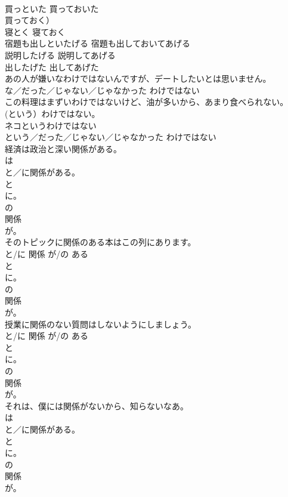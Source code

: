 \documentclass[8pt]{extreport}
\begin{document}
\begin{CJK}{UTF8}{min}
{\\	買っといた	買っておいた 
\\	買っておく）	
\\	寝とく	寝ておく	
\\	宿題も出しといたげる	宿題も出しておいてあげる	
\\	説明したげる	説明してあげる	
\\	出したげた	出してあげた	
\\	あの人が嫌いなわけではないんですが、デートしたいとは思いません。	
\\	{な／だった／じゃない／じゃなかった} わけではない 
\\	この料理はまずいわけではないけど、油が多いから、あまり食べられない。	
\\	(という）わけではない。 
\\	ネコというわけではない	
\\	{という／だった／じゃない／じゃなかった} わけではない 
\\	経済は政治と深い関係がある。	
\\	は 
\\	{と／に}関係がある。 
\\	と 
\\	に。 
\\	の 
\\	関係 
\\	が。
\\	そのトピックに関係のある本はこの列にあります。	
\\	{と/に} 関係 {が/の} ある
\\	と 
\\	に。 
\\	の 
\\	関係 
\\	が。
\\	授業に関係のない質問はしないようにしましょう。	
\\	{と/に} 関係 {が/の} ある
\\	と 
\\	に。 
\\	の 
\\	関係 
\\	が。
\\	それは、僕には関係がないから、知らないなあ。	
\\	は 
\\	{と／に}関係がある。 
\\	と 
\\	に。 
\\	の 
\\	関係 
\\	が。
}
\end{CJK}
\end{document}
